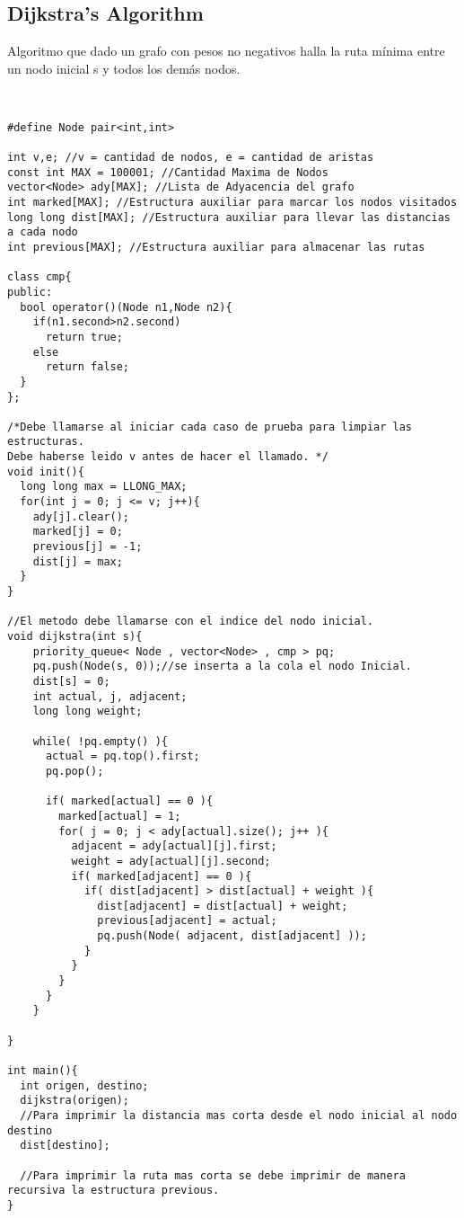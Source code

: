 \documentclass[11pt,letterpaper,twocolumn,twosided]{article}
\begin{document}
\subsection{Dijkstra's Algorithm}
Algoritmo que dado un grafo con pesos no negativos halla la ruta m\'inima entre un nodo inicial s y todos los dem\'as nodos.
\begin{lstlisting}


#define Node pair<int,int>

int v,e; //v = cantidad de nodos, e = cantidad de aristas
const int MAX = 100001; //Cantidad Maxima de Nodos
vector<Node> ady[MAX]; //Lista de Adyacencia del grafo
int marked[MAX]; //Estructura auxiliar para marcar los nodos visitados
long long dist[MAX]; //Estructura auxiliar para llevar las distancias a cada nodo
int previous[MAX]; //Estructura auxiliar para almacenar las rutas

class cmp{
public:
  bool operator()(Node n1,Node n2){
    if(n1.second>n2.second)
      return true;
    else
      return false;
  }
};

/*Debe llamarse al iniciar cada caso de prueba para limpiar las estructuras. 
Debe haberse leido v antes de hacer el llamado. */
void init(){
  long long max = LLONG_MAX;
  for(int j = 0; j <= v; j++){
    ady[j].clear();
    marked[j] = 0;
    previous[j] = -1;
    dist[j] = max;
  }
}

//El metodo debe llamarse con el indice del nodo inicial.
void dijkstra(int s){
    priority_queue< Node , vector<Node> , cmp > pq;
    pq.push(Node(s, 0));//se inserta a la cola el nodo Inicial.
    dist[s] = 0;
    int actual, j, adjacent;
    long long weight;

    while( !pq.empty() ){
      actual = pq.top().first;
      pq.pop();

      if( marked[actual] == 0 ){
        marked[actual] = 1;
        for( j = 0; j < ady[actual].size(); j++ ){
          adjacent = ady[actual][j].first;
          weight = ady[actual][j].second;
          if( marked[adjacent] == 0 ){
            if( dist[adjacent] > dist[actual] + weight ){
              dist[adjacent] = dist[actual] + weight;
              previous[adjacent] = actual;
              pq.push(Node( adjacent, dist[adjacent] ));
            }
          }
        }
      }
    }

}

int main(){
  int origen, destino;
  dijkstra(origen);
  //Para imprimir la distancia mas corta desde el nodo inicial al nodo destino
  dist[destino];

  //Para imprimir la ruta mas corta se debe imprimir de manera recursiva la estructura previous.
}\end{lstlisting}
\end{document}
